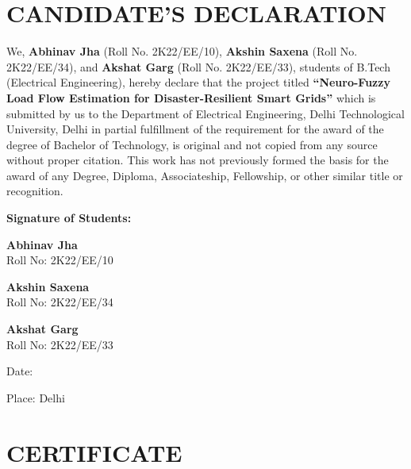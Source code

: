 \documentclass[12pt,a4paper]{report}
\newcommand{\projecttitle}{Neuro-Fuzzy Load Flow Estimation for Disaster-Resilient Smart Grids}
\newcommand{\authorone}{Abhinav Jha}
\newcommand{\rollone}{2K22/EE/10}
\newcommand{\authortwo}{Akshin Saxena}
\newcommand{\rolltwo}{2K22/EE/34}
\newcommand{\authorthree}{Akshat Garg}
\newcommand{\rollthree}{2K22/EE/33}
\begin{document}
\chapter*{CANDIDATE'S DECLARATION}
\thispagestyle{empty}

We, \textbf{\authorone} (Roll No. \rollone), \textbf{\authortwo} (Roll No. \rolltwo), and \textbf{\authorthree} (Roll No. \rollthree), students of B.Tech (Electrical Engineering), hereby declare that the project titled \textbf{``\projecttitle''} which is submitted by us to the Department of Electrical Engineering, Delhi Technological University, Delhi in partial fulfillment of the requirement for the award of the degree of Bachelor of Technology, is original and not copied from any source without proper citation. This work has not previously formed the basis for the award of any Degree, Diploma, Associateship, Fellowship, or other similar title or recognition.

\vspace{30mm}

\noindent\textbf{Signature of Students:}

\vspace{15mm}

\noindent\textbf{\authorone}\\
Roll No: \rollone

\vspace{10mm}

\noindent\textbf{\authortwo}\\
Roll No: \rolltwo

\vspace{10mm}

\noindent\textbf{\authorthree}\\
Roll No: \rollthree

\vspace{15mm}

\noindent Date: \hrulefill

\noindent Place: Delhi

\newpage

\chapter*{CERTIFICATE}
\thispagestyle{empty}
\end{document}
